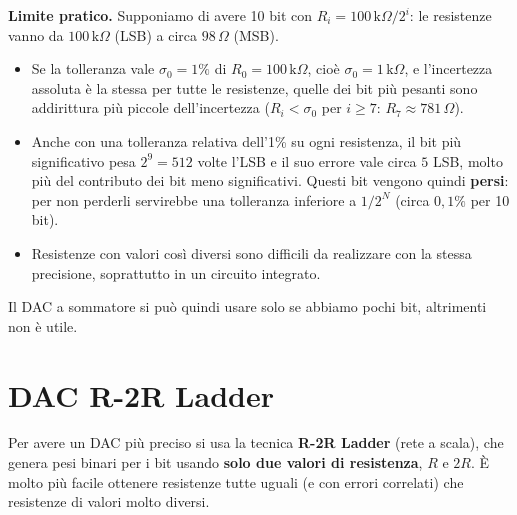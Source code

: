 \begin{important}
\textbf{Limite pratico.} Supponiamo di avere 10 bit con $R_i = 100\,\text{k}\Omega/2^i$: le
resistenze vanno da $100\,\text{k}\Omega$ (LSB) a circa $98\,\Omega$ (MSB).
\begin{itemize}[leftmargin=1.3em, itemsep=2pt]
    \item Se la tolleranza vale $\sigma_0 = 1\%$ di $R_0 = 100\,\text{k}\Omega$, cioè
          $\sigma_0 = 1\,\text{k}\Omega$, e l'incertezza assoluta è la stessa per tutte le
          resistenze, quelle dei bit più pesanti sono addirittura più piccole
          dell'incertezza ($R_i < \sigma_0$ per $i \ge 7$: $R_7 \approx 781\,\Omega$).
    \item Anche con una tolleranza relativa dell'1\% su ogni resistenza, il bit più
          significativo pesa $2^9=512$ volte l'LSB e il suo errore vale circa $5$ LSB, molto
          più del contributo dei bit meno significativi. Questi bit vengono quindi
          \textbf{persi}: per non perderli servirebbe una tolleranza inferiore a
          $1/2^N$ (circa $0{,}1\%$ per 10 bit).
    \item Resistenze con valori così diversi sono difficili da realizzare con la stessa
          precisione, soprattutto in un circuito integrato.
\end{itemize}
Il DAC a sommatore si può quindi usare solo se abbiamo pochi bit, altrimenti non è utile.
\end{important}

\section{DAC R-2R Ladder}

Per avere un DAC più preciso si usa la tecnica \textbf{R-2R Ladder} (rete a scala), che
genera pesi binari per i bit usando \textbf{solo due valori di resistenza}, $R$ e $2R$.
È molto più facile ottenere resistenze tutte uguali (e con errori correlati) che resistenze
di valori molto diversi.

